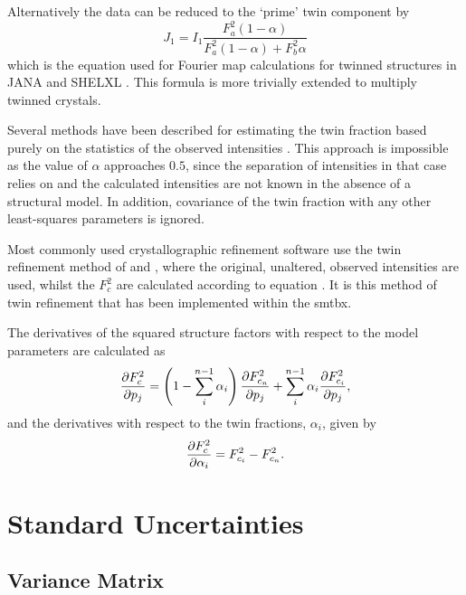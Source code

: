 \documentclass[pdf]{iucr}
\begin{document}
Alternatively the data can be reduced to the `prime' twin component by
\begin{equation}
J_1 = I_1 \frac{F_a^2 (1 - \alpha)}{F_a^2 (1 - \alpha) + F_b^2 \alpha}
\label{eqn:detwin_prime}
\end{equation}
which is the equation used for Fourier map calculations for twinned structures in JANA \cite{Petricek:2000aa,Dusek:2001aa} and SHELXL \cite{Sheldrick:1997aa}. This formula is more trivially extended to multiply twinned crystals.

Several methods have been described for estimating the twin fraction based purely on the statistics of the observed intensities \cite{Britton:1972aa,Murray-Rust:1973aa}. This approach is impossible as the value of $\alpha$ approaches $0.5$, since the separation of intensities in that case relies on  and the calculated intensities are not known in the absence of a structural model. In addition, covariance of the twin fraction with any other least-squares parameters is ignored.

Most commonly used crystallographic refinement software \cite{Sheldrick:2008aa,Betteridge:2003ab} use the twin refinement method of \cite{Jameson:1982aa} and \cite{Pratt:1971aa}, where the original, unaltered, observed intensities are used, whilst the $F_c^2$ are calculated according to equation . It is this method of twin refinement that has been implemented within the smtbx.

The derivatives of the squared structure factors with respect to the model parameters are calculated as
\begin{equation}
\frac{\partial F_c^2}{\partial p_j} = \left(1-\sum_i^{n-1}{\alpha_i}\right) \frac{\partial F_{c_n}^2}{\partial p_j} + \sum_i^{n-1}{\alpha_i \frac{\partial F_{c_i}^2}{\partial p_j}}
\label{eqn:twin_grads},
\end{equation}
and the derivatives with respect to the twin fractions, $\alpha_i$, given by
\begin{equation}
\frac{\partial F_c^2}{\partial \alpha_i} = F_{c_i}^2 - F_{c_n}^2
\label{eqn:twin_fraction_grads}.
\end{equation}





\section{Standard Uncertainties}
\label{sec:errors}

\subsection{Variance Matrix}
\label{sec:variance:matrix}
\end{document}
